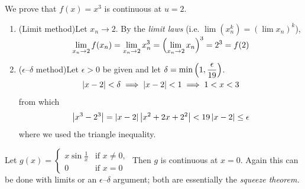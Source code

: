 \begin{examples}{}{}
\exstart We prove that $f(x)=x^3$ is continuous at $u=2$.
\begin{enumerate}\setcounter{enumi}{1}
	\item[]\begin{enumerate}
  	\item (Limit method)\quad Let $x_n\to 2$. By the \emph{limit laws} (i.e. $\lim(x_n^k)=\left(\lim x_n\right)^k$),
		\[\lim_{x_n\to 2}f(x_n)=\lim_{x_n\to 2}x_n^3=\smash{\Bigl(\lim_{x_n\to 2}x_n\Bigr)^3}=2^3=f(2)\]
  	\item ($\epsilon$--$\delta$ method)\quad Let $\epsilon>0$ be given and let $\displaystyle\delta=\smash{\min\left(1,\frac{\epsilon}{19}\right)}$.
		\[\left| x-2\right|<\delta\implies \left| x-2\right|<1\implies 1<x<3\]
		from which
		\[\left| x^3-2^3\right|		
			=\left| x-2\right|\left| x^2+2x+2^2\right| <19\left| x-2\right|\le\epsilon\]
		where we used the triangle inequality. %
	\end{enumerate}

	\begin{minipage}[t]{0.70\linewidth}\vspace{0pt}
		\item Let $g(x)=\begin{cases}
	x\sin\frac 1x&\text{if }x\neq 0,\\
	0&\text{if }x=0
	\end{cases}$\smallbreak
	Then $g$ is continuous at $x=0$. Again this can be done with limits or an $\epsilon$--$\delta$ argument; both are essentially the \emph{squeeze theorem.}
  

\end{minipage}
\end{enumerate}
\end{examples}
